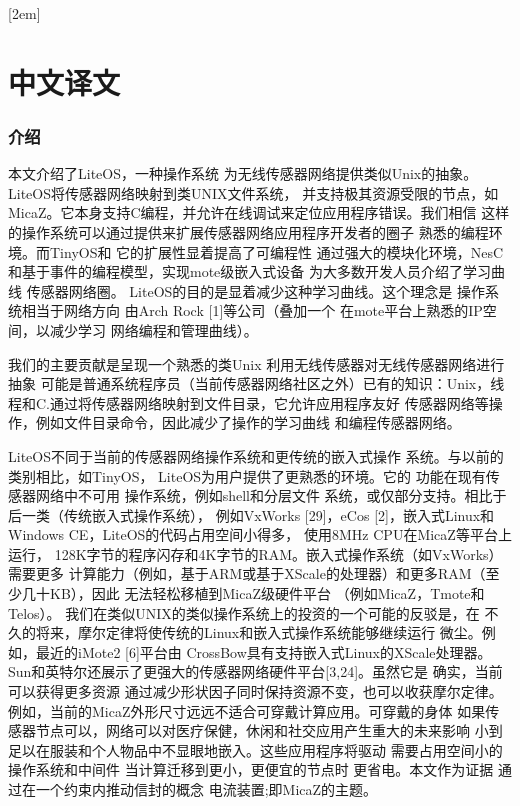 
[2em]{\vspace{.5\baselineskip}\xiaosan\song}
             {\prechaptername\CJKnumber{\thecontentslabel}\postchaptername\qquad}{}
             {}             %
\setcounter{page}{1}            %
\chapter*{中文译文}
\subsection{介绍}
本文介绍了LiteOS，一种操作系统
为无线传感器网络提供类似Unix的抽象。
LiteOS将传感器网络映射到类UNIX文件系统，
并支持极其资源受限的节点，如
MicaZ。它本身支持C编程，并允许在线调试来定位应用程序错误。我们相信
这样的操作系统可以通过提供来扩展传感器网络应用程序开发者的圈子
熟悉的编程环境。而TinyOS和
它的扩展性显着提高了可编程性
通过强大的模块化环境，NesC和基于事件的编程模型，实现mote级嵌入式设备
为大多数开发人员介绍了学习曲线
传感器网络圈。 LiteOS的目的是显着减少这种学习曲线。这个理念是
操作系统相当于网络方向
由Arch Rock [1]等公司（叠加一个
在mote平台上熟悉的IP空间，以减少学习
网络编程和管理曲线）。

我们的主要贡献是呈现一个熟悉的类Unix
利用无线传感器对无线传感器网络进行抽象
可能是普通系统程序员（当前传感器网络社区之外）已有的知识：Unix，线程和C.通过将传感器网络映射到文件目录，它允许应用程序友好
传感器网络等操作，例如文件目录命令，因此减少了操作的学习曲线
和编程传感器网络。

LiteOS不同于当前的传感器网络操作系统和更传统的嵌入式操作
系统。与以前的类别相比，如TinyOS，
LiteOS为用户提供了更熟悉的环境。它的
功能在现有传感器网络中不可用
操作系统，例如shell和分层文件
系统，或仅部分支持。相比于
后一类（传统嵌入式操作系统），
例如VxWorks [29]，eCos [2]，嵌入式Linux和
Windows CE，LiteOS的代码占用空间小得多，
使用8MHz CPU在MicaZ等平台上运行，
128K字节的程序闪存和4K字节的RAM。嵌入式操作系统（如VxWorks）需要更多
计算能力（例如，基于ARM或基于XScale的处理器）和更多RAM（至少几十KB），因此
无法轻松移植到MicaZ级硬件平台
（例如MicaZ，Tmote和Telos）。
我们在类似UNIX的类似操作系统上的投资的一个可能的反驳是，在
不久的将来，摩尔定律将使传统的Linux和嵌入式操作系统能够继续运行
微尘。例如，最近的iMote2 [6]平台由
CrossBow具有支持嵌入式Linux的XScale处理器。 Sun和英特尔还展示了更强大的传感器网络硬件平台[3,24]。虽然它是
确实，当前可以获得更多资源
通过减少形状因子同时保持资源不变，也可以收获摩尔定律。
例如，当前的MicaZ外形尺寸远远不适合可穿戴计算应用。可穿戴的身体
如果传感器节点可以，网络可以对医疗保健，休闲和社交应用产生重大的未来影响
小到足以在服装和个人物品中不显眼地嵌入。这些应用程序将驱动
需要占用空间小的操作系统和中间件
当计算迁移到更小，更便宜的节点时
更省电。本文作为证据
通过在一个约束内推动信封的概念
电流装置;即MicaZ的主题。

